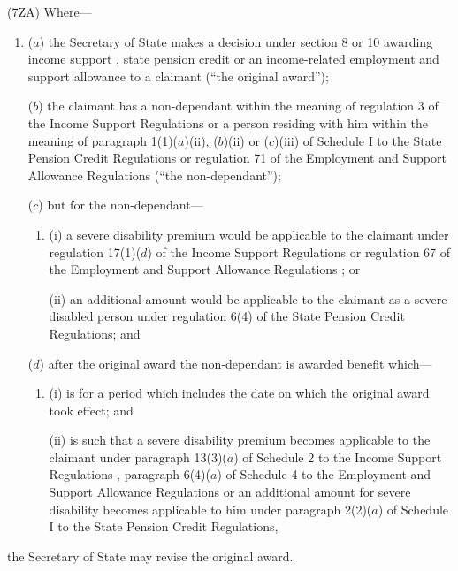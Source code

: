 \documentclass[12pt,a4paper]{article}
\begin{document}
(7ZA) Where—
\begin{enumerate}\item[]
($a$) the Secretary of State makes a decision under section 8 or 10 awarding income support%
, state pension credit or an income-related employment and support allowance  %
to a claimant (“the original award”);

($b$) the claimant has a non-dependant within the meaning of regulation 3 of the Income Support Regulations or a person residing with him within the meaning of paragraph 1(1)($a$)(ii), ($b$)(ii)  or ($c$)(iii)  of Schedule I to the State Pension Credit Regulations 
or regulation 71 of the Employment and Support Allowance Regulations  %
(“the non-dependant”);

($c$) but for the non-dependant—
\begin{enumerate}\item[]
(i) a severe disability premium would be applicable to the claimant under regulation 17(1)($d$)  of the Income Support Regulations
or regulation 67 of the Employment and Support Allowance Regulations%
; or

(ii)  an additional amount would be applicable to the claimant as a severe disabled person under regulation 6(4) of the State Pension Credit Regulations; and
\end{enumerate}

($d$) after the original award the non-dependant is awarded benefit which—
\begin{enumerate}\item[]
(i) is for a period which includes the date on which the original award took effect; and

(ii)  is such that a severe disability premium becomes applicable to the claimant under paragraph 13(3)($a$)  of Schedule 2 to the Income Support Regulations%
, paragraph 6(4)($a$)  of Schedule 4 to the Employment and Support Allowance Regulations  %
or an additional amount for severe disability becomes applicable to him under paragraph 2(2)($a$)  of Schedule I to the State Pension Credit Regulations,
\end{enumerate}
\end{enumerate}
the Secretary of State may revise the original award.
\end{document}
